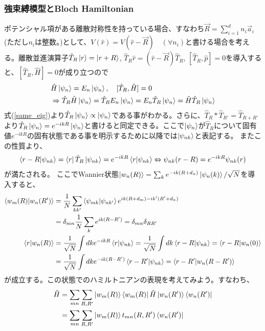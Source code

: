 \documentclass[a4paper,12pt]{jsarticle}
\begin{document}
\subsubsection{強束縛模型とBloch Hamiltonian}
ポテンシャル項がある離散対称性を持っている場合、すなわち$\vec{R} = \sum_{i = 1}^d n_i \vec{a}_i$(ただし$n_i$は整数。)として、$V(\hat{r}) = V(\hat{r} - \vec{R})\quad (\forall n_i)$と書ける場合を考える。離散並進演算子$\hat{T}_R\ket{r} = \ket{r+R}$, $\hat{T}_R \hat{r} = (\hat{r}-\vec{R})\hat{T}_R$, $[\hat{T}_R, \hat{p}]=0$を導入すると、$[\hat{T}_R,\hat{H}] = 0$が成り立つので
\begin{align}
  &\hat{H}\ket{\psi_n} = E_n\ket{\psi_n}, \quad [\hat{T}_R,\hat{H}] = 0\\
  &\Rightarrow \hat{T}_R\hat{H}\ket{\psi_n} = \hat{T}_RE_n\ket{\psi_n} = E_n\hat{T}_R\ket{\psi_n} = \hat{H}\hat{T}_R\ket{\psi_n}\label{same_eig}
\end{align}
式(\ref{same_eig})より$\hat{T}_R\ket{\psi_n} \propto \ket{\psi_n}$である事がわかる。さらに、$\hat{T}_R*\hat{T}_{R'} = \hat{T}_{R+R'}$より$\hat{T}_R\ket{\psi_n} = e^{-ikR} \ket{\psi_n}$と書けると同定できる。ここで$\ket{\psi_n}$が$\hat{T}_R$について固有値$e^{-ikR}$の固有状態である事を明示するために以降では$\ket{\psi_{nk}}$と表記する。
またこの性質より、
\begin{align}
  \braket{r-R}{\psi_{nk}} = \bra{r}\hat{T}_R\ket{\psi_{nk}} = e^{-ikR}\braket{r}{\psi_{nk}} \Leftrightarrow \psi_{nk}(r-R) = e^{-ikR}\psi_{nk}(r) 
\end{align}
が満たされる。
ここでWannier状態$\ket{w_n(R)} = \sum_k e^{-ik(R+d_n)}\ket{\psi_n(k)}/\sqrt{N}$を導入すると、
\begin{align}
  \braket{w_m(R)}{w_n(R')} &= \frac{1}{N}\sum_{kk'}\braket{\psi_{mk}}{\psi_{nk'}}e^{ik(R+d_m)-ik'(R'+d_n)}\nonumber\\
  & = \delta_{mn}\frac{1}{N}\sum_k e^{ik(R-R')} = \delta_{mn}\delta_{RR'}\\
  \braket{r}{w_n(R)} &= \frac{1}{\sqrt{N}}\int dk e^{-ikR} \braket{r}{\psi_{nk}} = \frac{1}{\sqrt{N}}\int dk \braket{r-R}{\psi_{nk}} = \braket{r-R}{w_n(0)}\\
  & = \frac{1}{\sqrt{N}}\int dk e^{-ik(R-R')}\braket{r-R'}{\psi_{nk}} = \braket{r-R'}{w_n(R-R')}
\end{align}
が成立する。この状態でのハミルトニアンの表現を考えてみよう。すなわち、
\begin{align}
  \hat{H} &= \sum_{mn}\sum_{R,R'}\ket{w_m(R)}\bra{w_m(R)}\hat{H}\ket{w_n(R')}\bra{w_n(R')}\\
  &= \sum_{mn}\sum_{R,R'}\ket{w_m(R)}t_{mn}(R, R')\bra{w_n(R')}
\end{align}
\end{document}
